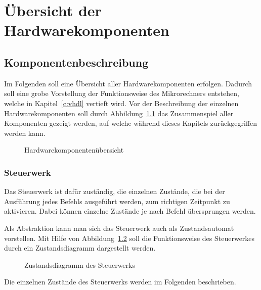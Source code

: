 \chapter{Übersicht der Hardwarekomponenten}
\label{c:hardware}
\section{Komponentenbeschreibung}
Im Folgenden soll eine Übersicht aller Hardwarekomponenten erfolgen. Dadurch
soll eine grobe Vorstellung der Funktionsweise des Mikrorechners entstehen,
welche in Kapitel~\ref{c:vhdl} vertieft wird. Vor der Beschreibung der einzelnen
Hardwarekomponenten soll durch Abbildung~\ref{pic:hardware_overview} das
Zusammenspiel aller Komponenten gezeigt werden, auf welche während dieses
Kapitels zurückgegriffen werden kann.
\begin{figure}[hb]
\centering
\def\svgwidth{\columnwidth}

\caption{Hardwarekomponentenübersicht}
\label{pic:hardware_overview}
\end{figure}
\pagebreak
\subsection{Steuerwerk}
\label{s:control}
Das Steuerwerk ist dafür zuständig, die einzelnen Zustände, die bei der
Ausführung jedes Befehls ausgeführt werden, zum richtigen Zeitpunkt zu
aktivieren. Dabei können einzelne Zustände je nach Befehl übersprungen werden.

Als Abstraktion kann man sich das Steuerwerk auch als Zustandsautomat
vorstellen. Mit Hilfe von Abbildung~\ref{pic:zustandsdiagramm} soll die
Funktionsweise des Steuerwerkes durch ein Zustandsdiagramm dargestellt werden.

\begin{figure}[htb]
\centering
{}
\caption{Zustandsdiagramm des Steuerwerks}
\label{pic:zustandsdiagramm}
\end{figure}
\pagebreak
Die einzelnen Zustände des Steuerwerks werden im Folgenden beschrieben.
